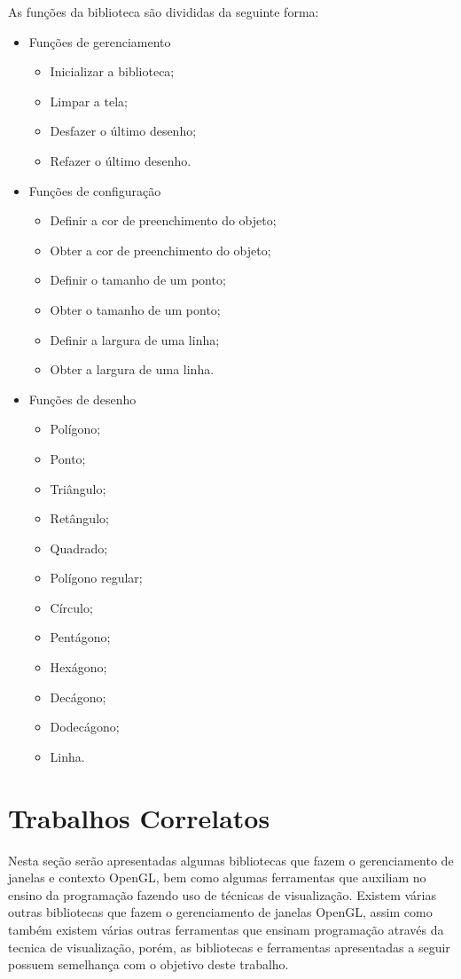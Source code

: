 \documentclass[12pt, %
openright,
oneside, %
a4paper,    %
brazil]{facom-ufu-abntex2}
\begin{document}
As funções da biblioteca são divididas da seguinte forma:
\begin{itemize}

    \item Funções de gerenciamento
    \begin{itemize}
    \item Inicializar a biblioteca;
    \item Limpar a tela;
    \item Desfazer o último desenho;
    \item Refazer o último desenho.
    \end{itemize}

    \item Funções de configuração
    \begin{itemize}
    \item Definir a cor de preenchimento do objeto;
    \item Obter a cor de preenchimento do objeto;
    \item Definir o tamanho de um ponto;
    \item Obter o tamanho de um ponto;
    \item Definir a largura de uma linha;
    \item Obter a largura de uma linha.
    \end{itemize}

    \item Funções de desenho
    \begin{itemize}

    \item Polígono;
    \item Ponto;
    \item Triângulo;
    \item Retângulo;
    \item Quadrado;
    \item Polígono regular;
    \item Círculo;
    \item Pentágono;
    \item Hexágono;
    \item Decágono;
    \item Dodecágono;
    \item Linha.

    \end{itemize}
\end{itemize}

\chapter{Trabalhos Correlatos}
Nesta seção serão apresentadas algumas bibliotecas que fazem o gerenciamento de janelas e contexto OpenGL, bem como algumas ferramentas que auxiliam no ensino da programação fazendo uso de técnicas de visualização. Existem várias outras bibliotecas que fazem o gerenciamento de janelas OpenGL, assim como também existem várias outras ferramentas que ensinam programação através da tecnica de visualização, porém, as bibliotecas e ferramentas apresentadas a seguir possuem semelhança com o objetivo deste trabalho.
\end{document}
